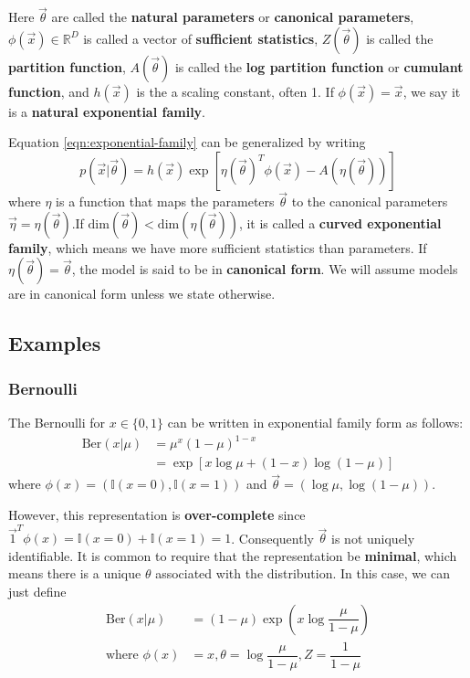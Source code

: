 Here $\vec{\theta}$ are called the \textbf{natural parameters} or \textbf{canonical parameters}, $\phi(\vec{x}) \in \mathbb{R}^D$ is called a vector of \textbf{sufficient statistics}, $Z(\vec{\theta})$ is called the \textbf{partition function}, $A(\vec{\theta})$ is called the \textbf{log partition function} or \textbf{cumulant function}, and $h(\vec{x})$ is the a scaling constant, often 1. If $\phi(\vec{x})=\vec{x}$, we say it is a \textbf{natural exponential family}.

Equation \ref{eqn:exponential-family} can be generalized by writing
\begin{equation}
p(\vec{x}|\vec{\theta}) = h(\vec{x})\exp[\eta(\vec{\theta})^T\phi(\vec{x})-A(\eta(\vec{\theta}))]
\end{equation}
where $\eta$ is a function that maps the parameters $\vec{\theta}$ to the canonical parameters $\vec{\eta}=\eta(\vec{\theta})$.If $\mathrm{dim}(\vec{\theta})<\mathrm{dim}(\eta(\vec{\theta}))$, it is called a \textbf{curved exponential family}, which means we have more sufficient statistics than parameters. If $\eta(\vec{\theta})=\vec{\theta}$, the model is said to be in \textbf{canonical form}. We will assume models are in canonical form unless we state otherwise.


\subsection{Examples}


\subsubsection{Bernoulli}
The Bernoulli for $x \in \{0,1\}$ can be written in exponential family form as follows:
\begin{equation}\begin{split}
\mathrm{Ber}(x|\mu)& =\mu^x(1-\mu)^{1-x} \\
& =\exp[x\log\mu+(1-x)\log(1-\mu)]
\end{split}\end{equation}
where $\phi(x)=(\mathbb{I}(x=0),\mathbb{I}(x=1))$ and $\vec{\theta}=(\log\mu,\log(1-\mu))$. 

However, this representation is \textbf{over-complete} since $\vec{1}^T\phi(x)=\mathbb{I}(x=0)+\mathbb{I}(x=1)=1$. Consequently $\vec{\theta}$ is not uniquely identifiable. It is common to require that the representation be \textbf{minimal}, which means there is a unique $\theta$ associated with the distribution. In this case, we can just define
\begin{align}
\mathrm{Ber}(x|\mu) & =(1-\mu)\exp\left(x\log\dfrac{\mu}{1-\mu}\right) \\
\text{where } \phi(x) & =x, \theta=\log\dfrac{\mu}{1-\mu}, Z=\dfrac{1}{1-\mu}  \nonumber
\end{align}

